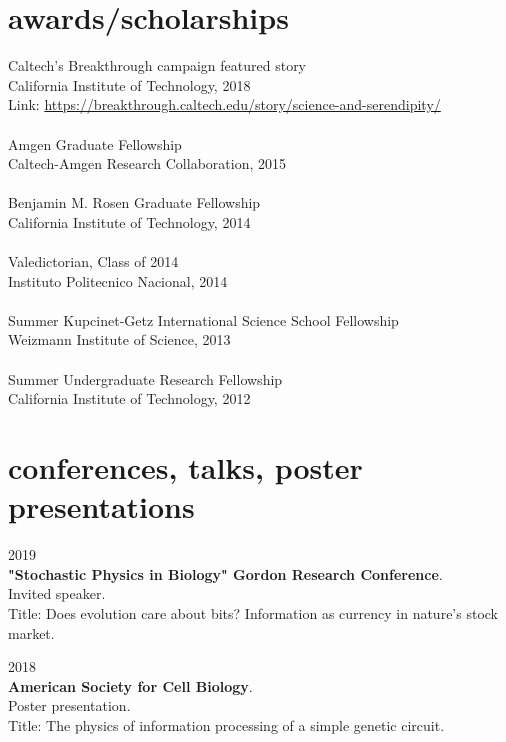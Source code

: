 \documentclass[]{friggeri-cv}
\begin{document}
\section{awards/scholarships}

Caltech's Breakthrough campaign featured story\\
{California Institute of Technology, 2018}\\
Link: \url{https://breakthrough.caltech.edu/story/science-and-serendipity/}\\
\\
Amgen Graduate Fellowship\\
{Caltech-Amgen Research Collaboration, 2015}\\
\\
Benjamin M. Rosen Graduate Fellowship\\
{California Institute of Technology, 2014}\\
\\
Valedictorian, Class of 2014\\
{Instituto Politecnico Nacional, 2014}\\
\\
Summer Kupcinet-Getz International Science School Fellowship\\
{Weizmann Institute of Science, 2013}\\
\\
Summer Undergraduate Research Fellowship\\
{California Institute of Technology, 2012}\\


\section{conferences, talks, poster presentations}

{\small{} 2019}\\
\textbf{"Stochastic Physics in Biology" Gordon Research Conference}.\\
{Invited speaker.}\\
Title: Does evolution care about bits? Information as currency in nature's stock market.

{\small{} 2018}\\
\textbf{American Society for Cell Biology}.\\
{Poster presentation.}\\
Title: The physics of information processing of a simple genetic circuit.
\end{document}
